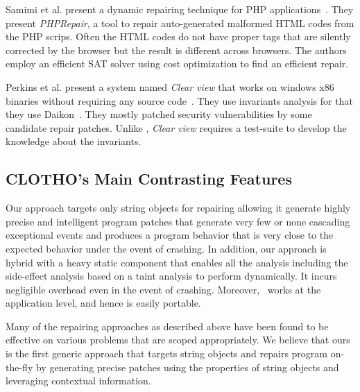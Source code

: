  Samimi et al. present a dynamic repairing
technique for PHP applications~\cite{SamirniSAMTH12}. They present
\textit{PHPRepair}, a tool to repair auto-generated malformed HTML codes from
the PHP scrips. Often the HTML codes do not have proper tags that are silently
corrected by the browser but the result is different across browsers. The
authors employ an efficient SAT solver using cost optimization to find an
efficient repair.

 Perkins et al. present a system named
\emph{Clear view} that works on windows x86 binaries without requiring any
source code~\cite{conf/sosp/PerkinsKLABCPSSSWZER09}. They use invariants
analysis for that they use Daikon~\cite{DBLP:journals/scp/ErnstPGMPTX07}. They
mostly patched security vulnerabilities by some candidate repair patches. Unlike
\tool, \emph{Clear view} requires a test-suite to develop the knowledge about
the invariants.

\subsection{CLOTHO's Main Contrasting Features}

Our approach targets only string objects for repairing allowing it generate
highly precise and intelligent program patches that generate very few or none
cascading exceptional events and produces a program behavior that is very close
to the expected behavior under the event of crashing. In addition, our approach
is hybrid with a heavy static component that enables all the analysis including
the side-effect analysis based on a taint analysis to perform dynamically. It
incurs negligible overhead even in the event of crashing. Moreover, \tool\ works
at the application level, and hence is easily portable.

Many of the repairing approaches as described above have been found to be
effective on various problems that are scoped appropriately. We believe that
ours is the first generic approach that targets string objects and repairs
program on-the-fly by generating precise patches using the properties of string
objects and leveraging contextual information.